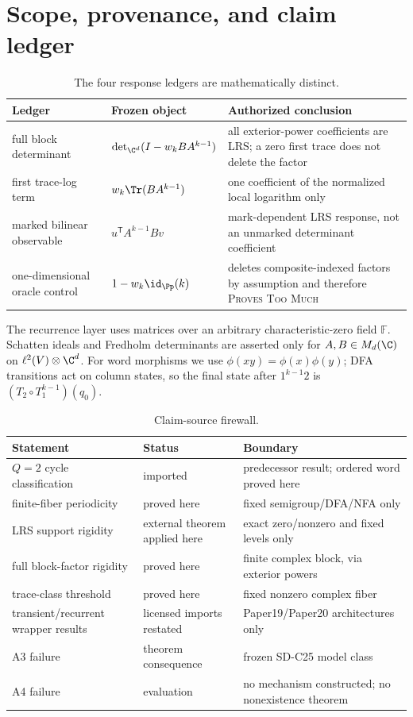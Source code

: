 \section{Scope, provenance, and claim ledger}
\label{app:scope}

\begin{table}[ht]
\centering
\caption{The four response ledgers are mathematically distinct.}
\label{tab:fourledgers}
\small
\begin{tabularx}{\textwidth}{L{3.2cm}Y Y}
\toprule
Ledger & Frozen object & Authorized conclusion \\
\midrule
full block determinant
& $\det_{\C^d}(I-w_kBA^{k-1})$
& all exterior-power coefficients are LRS; a zero first trace does not delete the factor \\
first trace-log term
& $w_k\Tr(BA^{k-1})$
& one coefficient of the normalized local logarithm only \\
marked bilinear observable
& $u^{\mathsf T}A^{k-1}Bv$
& mark-dependent LRS response, not an unmarked determinant coefficient \\
one-dimensional oracle control
& $1-w_k\id_{\Pp}(k)$
& deletes composite-indexed factors by assumption and therefore \textsc{Proves Too Much} \\
\bottomrule
\end{tabularx}
\end{table}

The recurrence layer uses matrices over an arbitrary characteristic-zero
field $\mathbb F$.  Schatten ideals and Fredholm determinants are asserted
only for $A,B\in M_d(\C)$ on
$\ell^2(V)\otimes\C^d$.  For word morphisms we use
$\phi(xy)=\phi(x)\phi(y)$; DFA transitions act on column states, so the
final state after $1^{k-1}2$ is
$(T_2\circ T_1^{k-1})(q_0)$.

\begin{table}[ht]
\centering
\caption{Claim-source firewall.}
\label{tab:firewall}
\small
\begin{tabularx}{\textwidth}{L{3.7cm}L{2.6cm}Y}
\toprule
Statement & Status & Boundary \\
\midrule
$Q=2$ cycle classification & imported & predecessor result; ordered word proved here \\
finite-fiber periodicity & proved here & fixed semigroup/DFA/NFA only \\
LRS support rigidity & external theorem applied here & exact zero/nonzero and fixed levels only \\
full block-factor rigidity & proved here & finite complex block, via exterior powers \\
trace-class threshold & proved here & fixed nonzero complex fiber \\
transient/recurrent wrapper results & licensed imports restated & Paper19/Paper20 architectures only \\
A3 failure & theorem consequence & frozen SD-C25 model class \\
A4 failure & evaluation & no mechanism constructed; no nonexistence theorem \\
\bottomrule
\end{tabularx}
\end{table}

